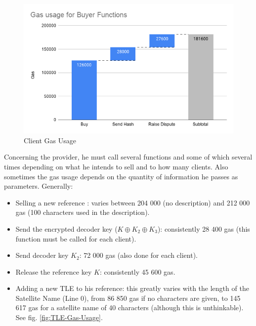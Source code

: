 \documentclass[conference]{IEEEtran}
\begin{document}
\begin{figure}[!htb]
\includegraphics[width=\linewidth]{Gas usage for Buyer Functions.png}
 \caption{Client Gas Usage}
 \label{fig:Client-Gas-Usage}
\end{figure}


Concerning the provider, he must call several functions and some of which several times depending on what he intends to sell and to how many clients. Also sometimes the gas usage depends on the quantity of information he passes as parameters. Generally:
\begin{itemize}
    \item Selling a new reference : varies between 204 000 (no description) and 212 000 gas (100 characters used in the description).
    \item Send the encrypted decoder key ($K \oplus K_2 \oplus K_3$): consistently 28 400 gas (this function must be called for each client).
    \item Send decoder key $K_2$: 72 000 gas (also done for each client).
    \item Release the reference key $K$: consistently 45 600 gas. 
    \item Adding a new TLE to his reference: this greatly varies with the length of the Satellite Name (Line 0), from 86 850 gas if no characters are given, to 145 617 gas for a satellite name of 40 characters (although this is unthinkable). See fig. \ref{fig:TLE-Gas-Usage}.
    
\end{itemize}
\end{document}
